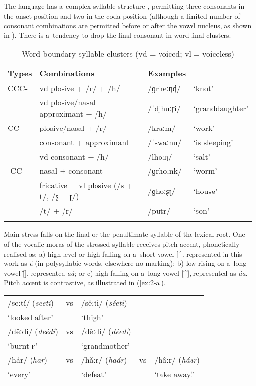 The language has a~complex syllable structure \citep{maddieson_syllable_2013}, permitting three consonants in the onset position and two in the coda position (although a limited number of consonant combinations are permitted before or after the vowel nucleus, as shown in ). There is a~tendency to drop the final consonant in word final clusters.


\begin{table}[ht]
\caption{Word boundary syllable clusters (vd = voiced; vl = voiceless)}
\begin{tabularx}{\textwidth}{ l l l l}
\lsptoprule
Types &
Combinations &
Examples \\\hline
CCC- &
vd plosive + /r/ + /h/&
/ɡrheːɳɖ/ &
`knot'\\
&
vd plosive/nasal + approximant + /h/&
/ˈdjhuːɽi/ &
`granddaughter'\\
CC- &
plosive/nasal + /r/ &
/kraːm/ &
`work'\\
&
consonant + approximant &
/ˈswaːnu/ &
`is sleeping'\\
&
vd consonant + /h/ &
/lhoːɳ/ &
`salt'\\
-CC &
nasal + consonant &
/ɡrhoːnk/ &
`worm'\\
&
fricative + vl plosive (/s + t/, /ʂ + ʈ/) &
/ɡhoːʂʈ/ &
`house'\\
&
/t/ + /r/ &
/putr/ &
`son'\\\lspbottomrule
\end{tabularx}
\label{tab:2-clusters}
\end{table}


Main stress falls on the final or the penultimate syllable of the lexical root. One of the vocalic moras of the stressed
syllable receives pitch accent, phonetically realised as: a) high level or high falling on a~short vowel
[\'{}], represented in this work as \textit{á} (in polysyllabic words, elsewhere no marking); b)
low rising on a~long vowel [\v{}], represented \textit{aá}; or c) high falling on a~long vowel [\^{}],
represented as \textit{áa}. Pitch accent is contrastive, as illustrated in (\ref{ex:2-a}).


\begin{exe}
\extab
\label{ex:2-a}
\begin{tabularx}{116mm}{ l l l l l }
/seːtí/ (\textit{seetí})  &
vs &
/sêːti/ (\textit{séeti}) \\
`looked after' &
&
`thigh' \\
/děːdi/ (\textit{deédi})  &
vs &
/dêːdi/ (\textit{déedi})  \\
`burnt \textsc{f}' &
&
`grandmother' \\
/hár/ (\textit{har})  &
vs &
/hǎːr/ (\textit{haár})  &
vs &
/hâːr/ (\textit{háar}) \\
`every' &
&
`defeat' &
&
`take away!'\\
\end{tabularx}
\end{exe}


